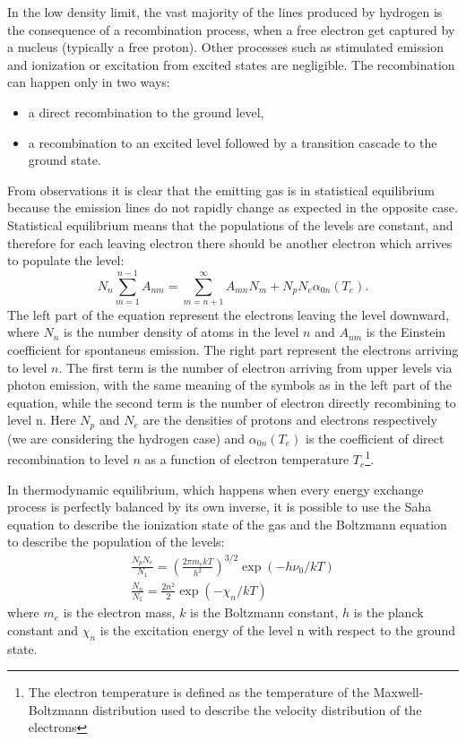 \documentclass[../thesis.tex]{subfiles}
\begin{document}
In the low density limit, the vast majority of the lines produced by hydrogen is the consequence of a recombination process, when a free electron get captured by a nucleus (typically a free proton).
Other processes such as stimulated emission and ionization or excitation from excited states are negligible.
The recombination can happen only in two ways: 
\begin{itemize}
    \item a direct recombination to the ground level,
    \item a recombination to an excited level followed by a transition cascade to the ground state.
\end{itemize}
From observations it is clear that the emitting gas is in statistical equilibrium because the emission lines do not rapidly change as expected in the opposite case.
Statistical equilibrium means that the populations of the levels are constant, and therefore for each leaving electron there should be another electron which arrives to populate the level:
\begin{equation}
    \label{eq:statistical_eq}
    N_n\sum\limits_{m=1}^{n-1} A_{nm} = \sum\limits_{m=n+1}^{\infty} A_{mn}N_m + N_pN_e\alpha_{0n}(T_e).
\end{equation}
The left part of the equation represent the electrons leaving the level downward, where $N_n$ is the number density of atoms in the level $n$ and $A_{nm}$ is the Einstein coefficient for spontaneus emission.
The right part represent the electrons arriving to level $n$. 
The first term is the number of electron arriving from upper levels via photon emission, with the same meaning of the symbols as in the left part of the equation, while the second term is the number of electron directly recombining to level n.
Here $N_p$ and $N_e$ are the densities of protons and electrons respectively (we are considering the hydrogen case) and $\alpha_{0n}(T_e)$ is the coefficient of direct recombination to level $n$ as a function of electron temperature $T_e$\footnote{The electron temperature is defined as the temperature of the Maxwell-Boltzmann distribution used to describe the velocity distribution of the electrons}.

In thermodynamic equilibrium, which happens when every energy exchange process is perfectly balanced by its own inverse, it is possible to use the Saha equation to describe the ionization state of the gas and the Boltzmann equation to describe the population of the levels:
\begin{gather}
    \label{eq:saha}
    \frac{N_pN_e}{N_1} = \left(\frac{2\pi m_e k T}{h^2}\right)^{3/2}\exp(-h\nu_0/kT)\\
    \label{eq:bolt}
    \frac{N_n}{N_1} = \frac{2n^2}{2} \exp(-\chi_n/kT)
\end{gather}
where $m_e$ is the electron mass, $k$ is the Boltzmann constant, $h$ is the planck constant and $\chi_n$ is the excitation energy of the level n with respect to the ground state.
\end{document}
